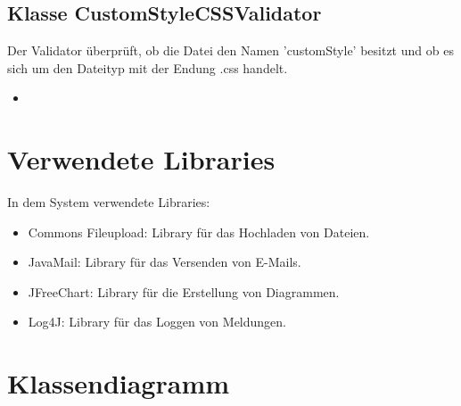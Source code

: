 \documentclass[a4paper]{scrreprt}
\begin{document}
	\subsection{Klasse CustomStyleCSSValidator}
	Der Validator überprüft, ob die Datei den Namen 'customStyle' besitzt und ob es sich um den Dateityp mit der Endung .css handelt.
	\begin{itemize}
		\item \override
	\end{itemize}
	
    

	
	\section{Verwendete Libraries}
	In dem System verwendete Libraries:
	\begin{itemize}
		\item Commons Fileupload: Library für das Hochladen von Dateien.
		\item JavaMail: Library für das Versenden von E-Mails.
		\item JFreeChart: Library für die Erstellung von Diagrammen.
		\item Log4J: Library für das Loggen von Meldungen.
	\end{itemize}
	\section{Klassendiagramm}
    
	
	
	
	
\end{document}
